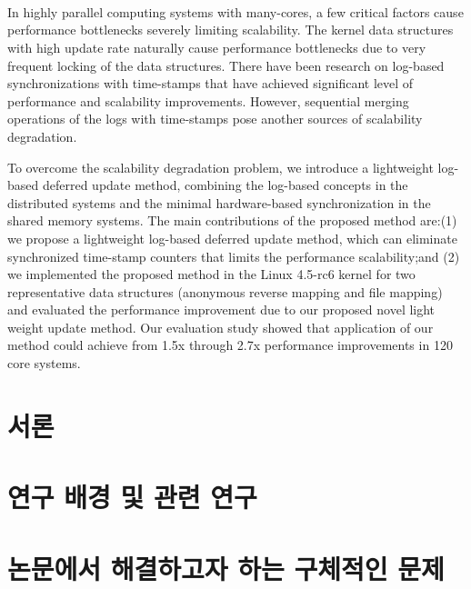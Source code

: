 \documentclass[doctor,korean,final]{kmu}
\begin{document}
\normalsize{
\hfill \break
\begin{center}
\\
\\
\\
\end{center}
\hfill \break

In highly parallel computing systems with many-cores, a few critical factors
cause performance bottlenecks severely limiting scalability.
The kernel data structures with high update rate naturally cause performance
bottlenecks due to very frequent locking of the data structures.
There have been research on log-based synchronizations with time-stamps that
have achieved significant level of performance and scalability improvements.
However, sequential merging operations of the logs with time-stamps pose another
sources of scalability degradation.

To overcome the scalability degradation problem, we introduce a lightweight
log-based deferred update method, combining the log-based concepts in the
distributed systems and the minimal hardware-based synchronization in the
shared memory systems.
The main contributions of the proposed method are:(1) we propose a lightweight
log-based deferred update method, which can eliminate synchronized time-stamp
counters that limits the performance scalability;and (2) we implemented the
 proposed method in the Linux 4.5-rc6 kernel for two representative data
 structures (anonymous reverse mapping and file mapping) and evaluated the
performance improvement due to our proposed novel light weight update method.
Our evaluation study showed that application of our method could
achieve from 1.5x through 2.7x performance improvements in 120 core
systems.}


\newpage \setcounter{pagemarker}{\value{page}}%

\chapter{서론}

\chapter{연구 배경 및 관련 연구}\label{sec:related}

\chapter{논문에서 해결하고자 하는 구체적인 문제}\label{sec:problem}

\end{document}
